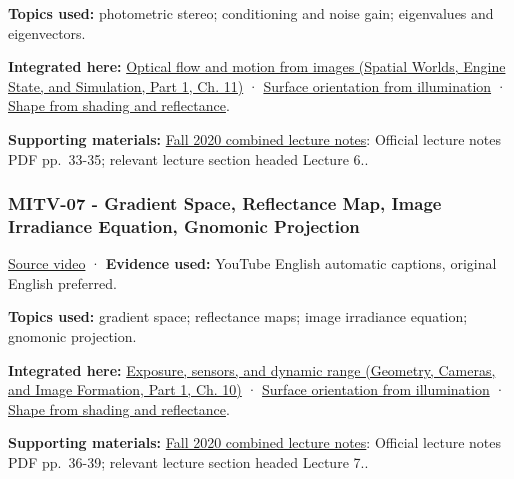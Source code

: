 \textbf{Topics used:} photometric stereo; conditioning and noise gain; eigenvalues and eigenvectors.

\textbf{Integrated here:} \href{../05-Spatial-Worlds-Engine-State-and-Simulation-P01/main.pdf\#04-visual-computing-ii-ch030-optical-flow-and-motion-from-images}{Optical flow and motion from images (Spatial Worlds, Engine State, and Simulation, Part 1, Ch. 11)} · \hyperref[04-visual-computing-ii-ch032-surface-orientation-from-illumination]{Surface orientation from illumination} · \hyperref[04-visual-computing-ii-ch032-shape-from-shading-and-reflectance]{Shape from shading and reflectance}.

\textbf{Supporting materials:} \href{https://ocw.mit.edu/courses/6-801-machine-vision-fall-2020/9ec44f69e72995c370b3797818ba01e6_MIT6_801F20_lectureNotes.pdf}{Fall 2020 combined lecture notes}: Official lecture notes PDF pp.~33-35; relevant lecture section headed Lecture 6..

\subsubsection{MITV-07 - Gradient Space, Reflectance Map, Image Irradiance Equation, Gnomonic Projection}\label{04-visual-computing-ii-ch036-mitv-07---gradient-space-reflectance-map-image-irradiance-equation-gnomonic-projection}

\hypertarget{04-visual-computing-ii-ch036-mitv-07---gradient-space-reflectance-map-image-irradiance-equation-gnomonic-projection}{}

\href{https://www.youtube.com/watch?v=qqtEQsBjh28}{Source video} · \textbf{Evidence used:} YouTube English automatic captions, original English preferred.

\textbf{Topics used:} gradient space; reflectance maps; image irradiance equation; gnomonic projection.

\textbf{Integrated here:} \href{../03-Geometry-Cameras-and-Image-Formation-P01/main.pdf\#03-visual-computing-i-ch003-exposure-sensors-and-dynamic-range}{Exposure, sensors, and dynamic range (Geometry, Cameras, and Image Formation, Part 1, Ch. 10)} · \hyperref[04-visual-computing-ii-ch032-surface-orientation-from-illumination]{Surface orientation from illumination} · \hyperref[04-visual-computing-ii-ch032-shape-from-shading-and-reflectance]{Shape from shading and reflectance}.

\textbf{Supporting materials:} \href{https://ocw.mit.edu/courses/6-801-machine-vision-fall-2020/9ec44f69e72995c370b3797818ba01e6_MIT6_801F20_lectureNotes.pdf}{Fall 2020 combined lecture notes}: Official lecture notes PDF pp.~36-39; relevant lecture section headed Lecture 7..

